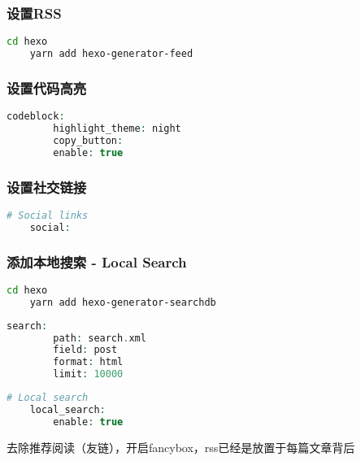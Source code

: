 \subsubsection{设置RSS}
\begin{lstlisting}[language={bash},title={安装插件hexo-generator-feed}]
    cd hexo
    yarn add hexo-generator-feed
\end{lstlisting}

\subsubsection{设置代码高亮}
\begin{lstlisting}[language={PHP},title={搜索主题Config相关代码并修改}]
    codeblock:
        highlight_theme: night
        copy_button:
        enable: true
\end{lstlisting}

\subsubsection{设置社交链接}
\begin{lstlisting}[language={PHP},title={搜索主题Config相关代码并修改}]
    # Social links
    social:
\end{lstlisting}


\subsubsection{添加本地搜索 - Local Search}
\begin{lstlisting}[language={bash},title={安装插件hexo-generator-searchdb}]
    cd hexo
    yarn add hexo-generator-searchdb
\end{lstlisting}
\begin{lstlisting}[language={PHP},title={站点Config新增相关代码}]
    search:
        path: search.xml
        field: post
        format: html
        limit: 10000
\end{lstlisting}
\begin{lstlisting}[language={PHP},title={搜索主题Config相关代码并修改}]
    # Local search
    local_search:
        enable: true
\end{lstlisting}

去除推荐阅读（友链），开启fancybox，rss已经是放置于每篇文章背后
